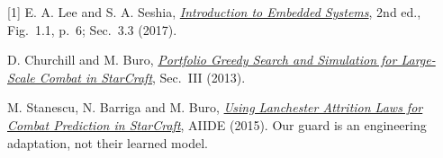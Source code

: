 \documentclass[10pt,letterpaper]{article}
\begin{document}
\vspace{3pt}
\footnotesize
[1] E. A. Lee and S. A. Seshia, \href{https://ptolemy.berkeley.edu/books/leeseshia/releases/LeeSeshia_DigitalV2_3.pdf}{\emph{Introduction to Embedded Systems}}, 2nd ed., Fig.~1.1, p.~6; Sec.~3.3 (2017).\par
[2] D. Churchill and M. Buro, \href{https://davechurchill.ca/publications/pdf/combat13.pdf}{\emph{Portfolio Greedy Search and Simulation for Large-Scale Combat in StarCraft}}, Sec.~III (2013).\par
[3] M. Stanescu, N. Barriga and M. Buro, \href{https://cdn.aaai.org/ojs/12780/12780-52-16297-1-2-20201228.pdf}{\emph{Using Lanchester Attrition Laws for Combat Prediction in StarCraft}}, AIIDE (2015). Our guard is an engineering adaptation, not their learned model.
\end{document}
